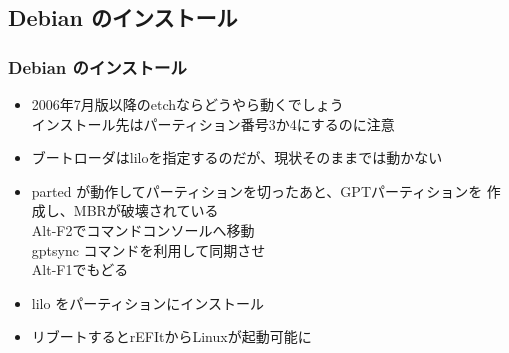 \documentclass[cjk,dvipdfmx]{beamer}
\begin{document}
\subsection{Debian のインストール}

\begin{frame}
 \frametitle{Debian のインストール}
\begin{itemize}
 \item 2006年7月版以降のetchならどうやら動くでしょう\\
       インストール先はパーティション番号3か4にするのに注意
 \item ブートローダはliloを指定するのだが、現状そのままでは動かない
 \item parted が動作してパーティションを切ったあと、GPTパーティションを
       作成し、MBRが破壊されている\\
       Alt-F2でコマンドコンソールへ移動\\
       gptsync コマンドを利用して同期させ\\
       Alt-F1でもどる
 \item lilo をパーティションにインストール
 \item リブートするとrEFItからLinuxが起動可能に
\end{itemize}
\end{frame}
\end{document}
